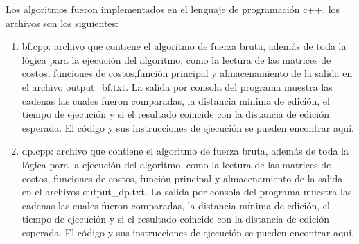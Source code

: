 

Los algoritmos fueron implementados en el lenguaje
de programación c++, los archivos son los siguientes:

\begin{enumerate}
    \item bf.cpp: archivo que contiene el algoritmo de fuerza bruta,
        además de toda la lógica para la ejecución del algoritmo, como
        la lectura de las matrices de costos, funciones
        de costos,función principal y
        almacenamiento de la salida en el archivo output\_bf.txt. La 
        salida por consola del programa muestra las cadenas las cuales
        fueron comparadas, la distancia mínima de edición, el tiempo de
        ejecución y si el resultado coincide con la distancia de edición
        esperada. El código y sus instrucciones de ejecución se pueden
        encontrar aquí.\cite{CodigoAlgoritmos}
    \item dp.cpp: archivo que contiene el algoritmo de fuerza bruta,
        además de toda la lógica para la ejecución del algoritmo, como 
        la lectura de las matrices de costos, funciones de costos, función
        principal y almacenamiento de la salida en el archivos
        output\_dp.txt. La 
        salida por consola del programa muestra las cadenas las cuales
        fueron comparadas, la distancia mínima de edición, el tiempo de
        ejecución y si el resultado coincide con la distancia de edición
        esperada. El código y sus instrucciones de ejecución se pueden
        encontrar aquí.\cite{CodigoAlgoritmos}

\end{enumerate}

